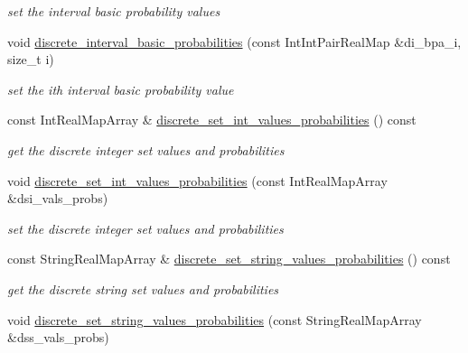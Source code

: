 \begin{DoxyCompactItemize}
\begin{DoxyCompactList}\small\item\em set the interval basic probability values \end{DoxyCompactList}\item 
void \hyperlink{classPecos_1_1EpistemicDistParams_a7406fef4e867900f229ff6620a7db85b}{discrete\+\_\+interval\+\_\+basic\+\_\+probabilities} (const Int\+Int\+Pair\+Real\+Map \&di\+\_\+bpa\+\_\+i, size\+\_\+t i)\label{classPecos_1_1EpistemicDistParams_a7406fef4e867900f229ff6620a7db85b}

\begin{DoxyCompactList}\small\item\em set the ith interval basic probability value \end{DoxyCompactList}\item 
const Int\+Real\+Map\+Array \& \hyperlink{classPecos_1_1EpistemicDistParams_a74664dadc4c09d0f154e6ecc7db882cf}{discrete\+\_\+set\+\_\+int\+\_\+values\+\_\+probabilities} () const \label{classPecos_1_1EpistemicDistParams_a74664dadc4c09d0f154e6ecc7db882cf}

\begin{DoxyCompactList}\small\item\em get the discrete integer set values and probabilities \end{DoxyCompactList}\item 
void \hyperlink{classPecos_1_1EpistemicDistParams_a643ede8b8b26ba40b3940ee4cb3843ac}{discrete\+\_\+set\+\_\+int\+\_\+values\+\_\+probabilities} (const Int\+Real\+Map\+Array \&dsi\+\_\+vals\+\_\+probs)\label{classPecos_1_1EpistemicDistParams_a643ede8b8b26ba40b3940ee4cb3843ac}

\begin{DoxyCompactList}\small\item\em set the discrete integer set values and probabilities \end{DoxyCompactList}\item 
const String\+Real\+Map\+Array \& \hyperlink{classPecos_1_1EpistemicDistParams_a8dd6ed1e2754ce0bec6eb0c804b0f015}{discrete\+\_\+set\+\_\+string\+\_\+values\+\_\+probabilities} () const \label{classPecos_1_1EpistemicDistParams_a8dd6ed1e2754ce0bec6eb0c804b0f015}

\begin{DoxyCompactList}\small\item\em get the discrete string set values and probabilities \end{DoxyCompactList}\item 
void \hyperlink{classPecos_1_1EpistemicDistParams_aaf98a6c246d0872e1dc08a56c4d844b7}{discrete\+\_\+set\+\_\+string\+\_\+values\+\_\+probabilities} (const String\+Real\+Map\+Array \&dss\+\_\+vals\+\_\+probs)\label{classPecos_1_1EpistemicDistParams_aaf98a6c246d0872e1dc08a56c4d844b7}


\end{DoxyCompactItemize}
